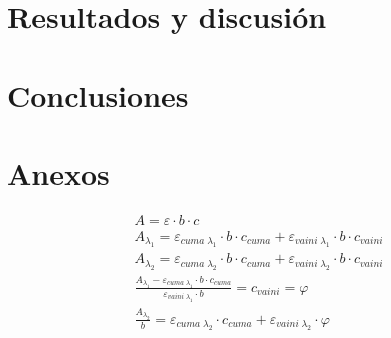 \documentclass[11pt,fleqn]{article} %
\begin{document}
\begin{multicols}{2}
		\section{Resultados y discusión}
				
		\section{Conclusiones} 	 
		 
		
	\end{multicols}	

	\newpage %
	\section*{Anexos} %
		
	\begin{multicols}{2}
		
		\begin{gather}
			A=\varepsilon \cdot b \cdot c \\
			A_{\lambda_1}=\varepsilon _{cuma \; \lambda_1} \cdot b \cdot c _{cuma} + \varepsilon _{vaini \; \lambda_1} \cdot b \cdot c _{vaini} \\
			A_{\lambda_2}=\varepsilon _{cuma \; \lambda_2} \cdot b \cdot c _{cuma} + \varepsilon _{vaini \; \lambda_2} \cdot b \cdot c _{vaini} \\
			\frac{A_{\lambda_1} - \varepsilon _{cuma \; \lambda_1} \cdot b \cdot c _{cuma}}{\varepsilon _{vaini \; \lambda_1} \cdot b} =  c _{vaini} = \varphi  \\
			\frac{A_{\lambda_2}}{b}= \varepsilon _{cuma \; \lambda_2} \cdot c _{cuma} + \varepsilon _{vaini \; \lambda_2} \cdot \varphi
		\end{gather}
		
	\end{multicols}	
	
\end{document}
